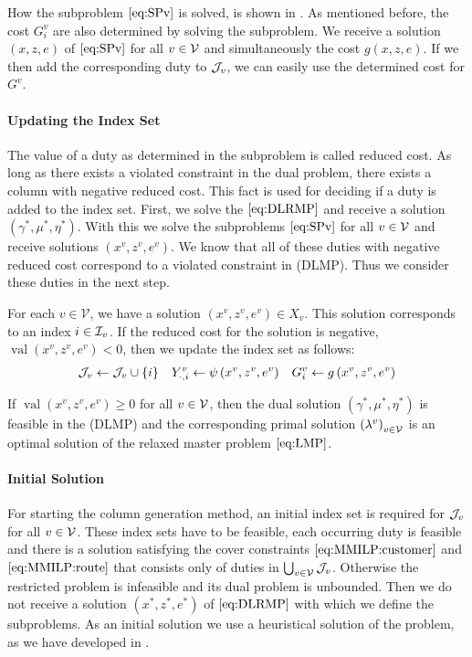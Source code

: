 How the subproblem $\eqref{eq:SPv}$ is solved, is shown in . As mentioned before, the cost $G^v_i$ are also determined by solving the subproblem. We receive a solution $(x,z,e)$ of $\eqref{eq:SPv}$ for all $v\in\mathcal{V}$ and simultaneously the cost $g(x,z,e)$. If we then add the corresponding duty to $\mathcal{J}_v$, we can easily use the determined cost for $G^v$.

\paragraph{Updating the Index Set} \parfill

The value of a duty as determined in the subproblem is called reduced cost. As long as there exists a violated constraint in the dual problem, there exists a column with negative reduced cost. This fact is used for deciding if a duty is added to the index set. First, we solve the $\eqref{eq:DLRMP}$ and receive a solution $\left(\gamma^*,\mu^*,\eta^*\right)$. With this we solve the subproblems $\eqref{eq:SPv}$ for all $v\in\mathcal{V}$ and receive solutions $\left(x^v,z^v,e^v\right)$. We know that all of these duties with negative reduced cost correspond to a violated constraint in (DLMP). Thus we consider these duties in the next step. 

For each $v\in\mathcal{V}$, we have a solution ${\left(x^v,z^v,e^v\right)\in X_v}$. This solution corresponds to an index ${i\in\mathcal{I}_v}$. If the reduced cost for the solution is negative, \ie $\operatorname{val}\left(x^v,z^v,e^v\right)<0$, then we update the index set as follows:
\begin{align*}
	\mathcal{J}_v\gets\mathcal{J}_v\cup\{i\} && Y^v_{\cdot,i}\gets\psi\left(x^v,z^v,e^v\right) && G^v_i\gets g\left(x^v,z^v,e^v\right)
\end{align*}

If $\operatorname{val}\left(x^v,z^v,e^v\right)\geq 0$ for all $v\in\mathcal{V}$, then the dual solution $\left(\gamma^*,\mu^*,\eta^*\right)$ is feasible in the (DLMP) and the corresponding primal solution $\left(\lambda^v\right)_{v\in\mathcal{V}}$ is an optimal solution of the relaxed master problem $\eqref{eq:LMP}$.

\paragraph{Initial Solution} \parfill

For starting the column generation method, an initial index set is required for $\mathcal{J}_v$ for all $v\in\mathcal{V}$. These index sets have to be feasible, \ie each occurring duty is feasible and there is a solution satisfying the cover constraints $\eqref{eq:MMILP:customer}$ and $\eqref{eq:MMILP:route}$ that consists only of duties in $\bigcup_{v\in\mathcal{V}}\mathcal{J}_v$. Otherwise the restricted problem is infeasible and its dual problem is unbounded. Then we do not receive a solution $\left(x^*,z^*,e^*\right)$ of $\eqref{eq:DLRMP}$ with which we define the subproblems. As an initial solution we use a heuristical solution of the problem, as we have developed in .

